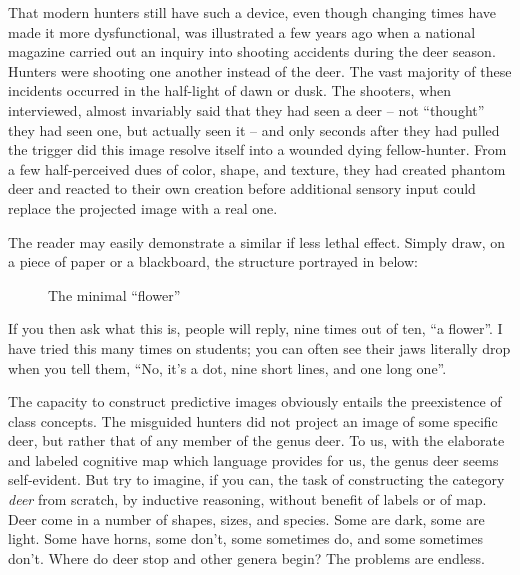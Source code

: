 
That modern hunters still have such a device, even though changing times have made it more dysfunctional, was illustrated a few years ago when a national magazine carried out an inquiry into shooting accidents during the deer season. Hunters were shooting one another instead of the deer. The vast majority of these incidents occurred in the half-light of dawn or dusk. The shooters, when interviewed, almost invariably said that they had seen a deer -- not ``thought'' they had seen one, but actually seen it -- and only seconds after they had pulled the trigger did this image resolve itself into a wounded dying fellow-hunter. From a few half-perceived dues of color, shape, and texture, they had created phantom deer and reacted to their own creation before additional sensory input could replace the projected image with a real one.

The reader may easily demonstrate a similar if less lethal effect. Simply draw, on a piece of paper or a blackboard, the structure portrayed in  below:

\begin{figure}
	\begin{center}
	\end{center}
	\caption{The minimal ``flower''}\label{fig:4.1}
\end{figure}


\noindent If you then ask what this is, people will reply, nine times out of ten,  ``a flower''. I have tried this many times on students; you can often see their jaws literally drop when you tell them, ``No, it's a dot, nine short lines, and one long one''.

The capacity to construct predictive images obviously entails the preexistence of class concepts. The misguided hunters did not project an image of some specific deer, but rather that of any member of the genus deer. To us, with the elaborate and labeled cognitive map which language provides for us, the genus deer seems self-evident. But try to imagine, if you can, the task of constructing the category \textit{deer} from scratch, by inductive reasoning, without benefit of labels or of map. Deer come in a number of shapes, sizes, and species. Some are dark, some are light. Some have horns, some don't, some sometimes do, and some sometimes don't. Where do deer stop and other genera begin? The problems are endless.

